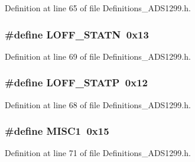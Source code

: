 Definition at line 65 of file Definitions\+\_\+\+A\+D\+S1299.\+h.

\subsubsection[{\texorpdfstring{L\+O\+F\+F\+\_\+\+S\+T\+A\+TN}{LOFF_STATN}}]{\setlength{\rightskip}{0pt plus 5cm}\#define L\+O\+F\+F\+\_\+\+S\+T\+A\+TN~0x13}\hypertarget{group__Definitions__ADS1299_ga294d95c8864fdd237709e896fc0b7f2c}{}\label{group__Definitions__ADS1299_ga294d95c8864fdd237709e896fc0b7f2c}


Definition at line 69 of file Definitions\+\_\+\+A\+D\+S1299.\+h.

\subsubsection[{\texorpdfstring{L\+O\+F\+F\+\_\+\+S\+T\+A\+TP}{LOFF_STATP}}]{\setlength{\rightskip}{0pt plus 5cm}\#define L\+O\+F\+F\+\_\+\+S\+T\+A\+TP~0x12}\hypertarget{group__Definitions__ADS1299_ga80a21df4016d8e925264718cf7e4b74b}{}\label{group__Definitions__ADS1299_ga80a21df4016d8e925264718cf7e4b74b}


Definition at line 68 of file Definitions\+\_\+\+A\+D\+S1299.\+h.

\subsubsection[{\texorpdfstring{M\+I\+S\+C1}{MISC1}}]{\setlength{\rightskip}{0pt plus 5cm}\#define M\+I\+S\+C1~0x15}\hypertarget{group__Definitions__ADS1299_gae329ec8008096911d2610e19ddb46c71}{}\label{group__Definitions__ADS1299_gae329ec8008096911d2610e19ddb46c71}


Definition at line 71 of file Definitions\+\_\+\+A\+D\+S1299.\+h.


